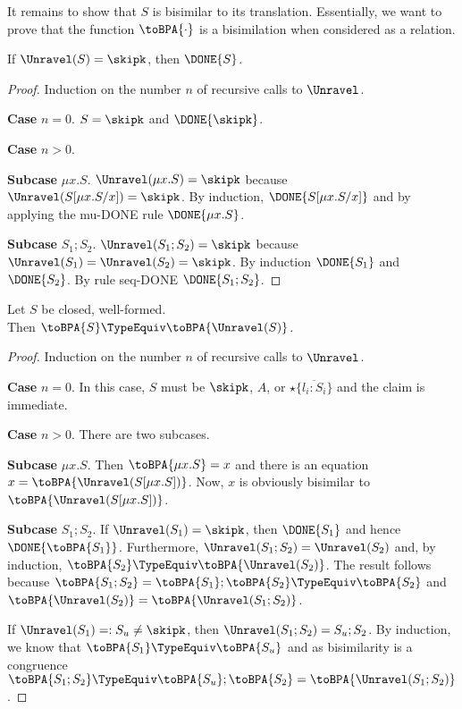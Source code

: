 It remains to show that $S$ is bisimilar to its
translation. Essentially, we want to prove that the function
$\toBPA{\cdot}$ is a bisimilation when considered as a relation.

\begin{lemma}\label{lemma:app:skip-implies-done}
  If $\Unravel (S) = \skipk$, then $\DONE{S}$.
\end{lemma}
\begin{proof}
  Induction on the number $n$ of recursive calls to $\Unravel$.

  \textbf{Case }$n=0$. $S=\skipk$ and $\DONE{\skipk}$.

  \textbf{Case }$n>0$.

  \textbf{Subcase }$\mu x.S$. $\Unravel (\mu x.S) = \skipk$ 
  because $\Unravel (S[\mu x.S/x]) = \skipk$. By induction,
  $\DONE{S[\mu x.S/x]}$ and by applying the mu-DONE rule $\DONE{\mu
    x.S}$.

  \textbf{Subcase }$S_1;S_2$.
  $\Unravel (S_1;S_2) = \skipk$ because $\Unravel (S_1) =
  \Unravel (S_2) = \skipk$. By induction $\DONE{S_1}$ and
  $\DONE{S_2}$. By rule seq-DONE $\DONE{S_1;S_2}$.
\end{proof}

\begin{lemma}\label{lemma:app:s=unr-s}
  Let $S$ be closed, well-formed. \\
  Then
  $\toBPA{S} \TypeEquiv \toBPA{\Unravel (S)}$.
\end{lemma}
\begin{proof}
  Induction on the number $n$ of recursive calls to $\Unravel$.

  \textbf{Case }$n=0$. In this case, $S$ must be $\skipk$, $A$, or
  $\star\{\overline{l_i:S_i}\}$ and the claim is immediate.

  \textbf{Case }$n>0$. There are two subcases.

  \textbf{Subcase }$\mu x.S$. Then $\toBPA{\mu x.S} = x$ and there is
  an equation $x = \toBPA{\Unravel(S[\mu x.S])}$. Now, $x$ is
  obviously bisimilar to $\toBPA{\Unravel(S[\mu x.S])}$.

  \textbf{Subcase }$S_1;S_2$. If $\Unravel (S_1) = \skipk$, then
  $\DONE{S_1}$ and hence $\DONE{\toBPA{S_1}}$. Furthermore, $\Unravel
  (S_1;S_2) = \Unravel (S_2)$ and, by induction, $\toBPA{S_2}
  \TypeEquiv \toBPA{\Unravel(S_2)}$. The result follows because
  $\toBPA{S_1;S_2} = \toBPA{S_1};\toBPA{S_2} \TypeEquiv \toBPA{S_2}$
  and $\toBPA{\Unravel(S_2)} = \toBPA{\Unravel (S_1;S_2)}$.

  If $\Unravel (S_1) =: S_u \ne \skipk$, then $\Unravel (S_1;S_2) =
  S_u; S_2$.
  By induction, we know that $\toBPA{S_1} \TypeEquiv \toBPA{S_u}$ and
  as bisimilarity is a congruence  $\toBPA{S_1;S_2} \TypeEquiv
  \toBPA{S_u}; \toBPA{S_2} = \toBPA{\Unravel (S_1;S_2)}$.
\end{proof}

